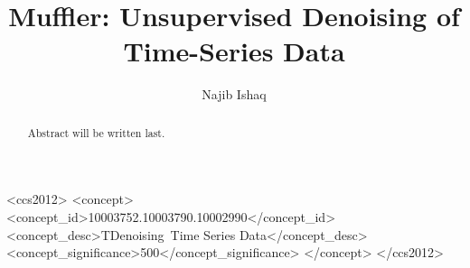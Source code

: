 \documentclass[acmsmall]{acmart}
\begin{document}
    \title{Muffler: Unsupervised Denoising of Time-Series Data}

    \author{Najib Ishaq}

    \renewcommand{\shortauthors}{Najib}

    \begin{abstract}
        Abstract will be written last.
    \end{abstract}

    \begin{CCSXML}
        <ccs2012>
            <concept>
                <concept_id>10003752.10003790.10002990</concept_id>
                <concept_desc>TDenoising~Time Series Data</concept_desc>
                <concept_significance>500</concept_significance>
            </concept>
        </ccs2012>
\end{CCSXML}

    \maketitle



    
    
    
    
    

    
    
\end{document}
